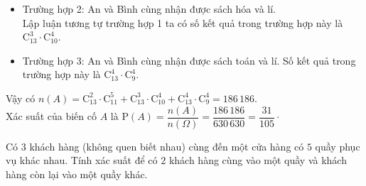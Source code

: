 \begin{bt}
{\begin{itemize}
				\item Trường hợp 2: An và Bình cùng nhận được sách hóa và lí.\\
				 Lập luận tương tự trường hợp 1 ta có số kết quả trong trường hợp này là $\mathrm{C}_{13}^3\cdot \mathrm{C}_{10}^4$.
				\item Trường hợp 3: An và Bình cùng nhận được sách toán và lí. Số kết quả trong trường hợp này là $\mathrm{C}_{13}^4\cdot \mathrm{C}_9^4$.
			\end{itemize}
			Vậy có $n(A)=\mathrm{C}_{13}^2\cdot \mathrm{C}_{11}^5+\mathrm{C}_{13}^3\cdot \mathrm{C}_{10}^4+\mathrm{C}_{13}^4\cdot \mathrm{C}_9^4=186\,186$.\\
			Xác suất của biến cố $A$ là $\mathrm{P}(A)=\dfrac{n(A)}{n(\Omega)}=\dfrac{186\,186}{630\,630}=\dfrac{31}{105}\cdot$
	}
\end{bt}

\begin{bt}%
	Có $3$ khách hàng (không quen biết nhau) cùng đến một cửa hàng có $5$ quầy phục vụ khác nhau. Tính xác suất để có $2$ khách hàng cùng vào một quầy và khách hàng còn lại vào một quầy khác.
\end{bt}

